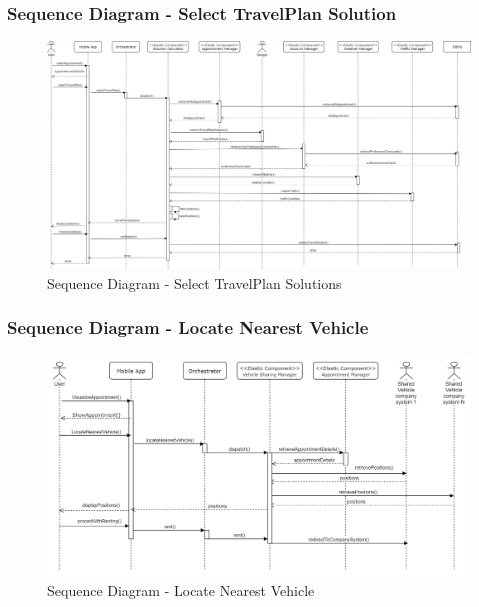 	\subsubsection{Sequence Diagram - Select TravelPlan Solution}
		\label{sect:Select TravelPlan Solution}
		\begin{figure}[H]
			\centerline{\includegraphics[width=0.9\paperwidth]{Images/selectTravelSolution}}
			\caption{Sequence Diagram - Select TravelPlan Solutions}
		\end{figure}
	\subsubsection{Sequence Diagram - Locate Nearest Vehicle}
		\begin{figure}[H]
			\centerline{\includegraphics[width=0.9\paperwidth]{Images/LocateNearest}}
			\caption{Sequence Diagram - Locate Nearest Vehicle}
		\end{figure}
		
